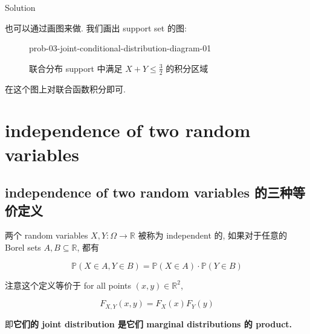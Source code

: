 \begin{qlsolution}{Solution}
\begin{itemize}
  也可以通过画图来做. 我们画出 support set 的图:

  \begin{figure}[htbp]
  \centering
  \begin{qldrawing}
  \csname prob-03-joint-conditional-distribution-diagram-01\endcsname
  \end{qldrawing}

  \caption{联合分布 support 中满足 \(\mathit{X} + \mathit{Y} \leq \frac{3}{2}\)
  的积分区域}

  \label{fig-prob-03-joint-conditional-distribution-diagram-01}

  \end{figure}

  在这个图上对联合函数积分即可.
\end{itemize}

\end{qlsolution}

\section{independence of two random variables}\label{independence-of-two-random-variables}

\subsection{independence of two random variables 的三种等价定义}\label{independence-of-two-random-variables-ux7684ux4e09ux79cdux7b49ux4ef7ux5b9aux4e49}

\begin{definition}{}

两个 random variables \(\mathit{X},\mathit{Y}:\Omega\rightarrow\mathbb{R}\) 被称为 independent 的, 如果对于任意的 Borel sets \(\mathit{A},\mathit{B} \subseteq \mathbb{R}\), 都有

\[\mathbb{P}(\mathit{X} \in \mathit{A},\mathit{Y} \in \mathit{B}) = \mathbb{P}(\mathit{X} \in \mathit{A}) \cdot \mathbb{P}(\mathit{Y} \in \mathit{B})\]

注意这个定义等价于 for all points \((\mathit{x},\mathit{y}) \in \mathbb{R}^{2}\),

\[\mathit{F}_{\mathit{X},\mathit{Y}}(\mathit{x},\mathit{y}) = \mathit{F}_{\mathit{X}}(\mathit{x})\mathit{F}_{\mathit{Y}}(\mathit{y})\]

即\textbf{它们的 joint distribution 是它们 marginal distributions 的 product.}

\end{definition}

